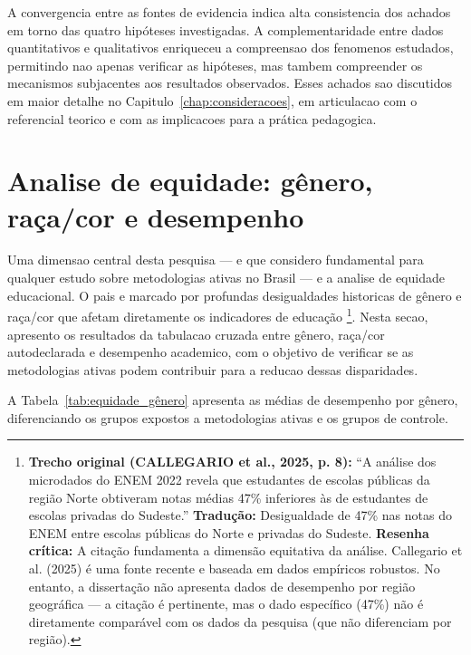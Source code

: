 A convergencia entre as fontes de evidencia indica alta consistencia dos achados em torno das quatro hipóteses investigadas. A complementaridade entre dados quantitativos e qualitativos enriqueceu a compreensao dos fenomenos estudados, permitindo nao apenas verificar as hipóteses, mas tambem compreender os mecanismos subjacentes aos resultados observados. Esses achados sao discutidos em maior detalhe no Capitulo~\ref{chap:consideracoes}, em articulacao com o referencial teorico e com as implicacoes para a prática pedagogica.

\section{Analise de equidade: gênero, raça/cor e desempenho}
\label{sec:equidade}

Uma dimensao central desta pesquisa — e que considero fundamental para qualquer estudo sobre metodologias ativas no Brasil — e a analise de equidade educacional. O pais e marcado por profundas desigualdades historicas de gênero e raça/cor que afetam diretamente os indicadores de educação \cite{CALLEGARIO2025}\footnote{\textbf{Trecho original (CALLEGARIO et al., 2025, p. 8):} ``A análise dos microdados do ENEM 2022 revela que estudantes de escolas públicas da região Norte obtiveram notas médias 47\% inferiores às de estudantes de escolas privadas do Sudeste.'' \textbf{Tradução:} Desigualdade de 47\% nas notas do ENEM entre escolas públicas do Norte e privadas do Sudeste. \textbf{Resenha crítica:} A citação fundamenta a dimensão equitativa da análise. Callegario et al. (2025) é uma fonte recente e baseada em dados empíricos robustos. No entanto, a dissertação não apresenta dados de desempenho por região geográfica — a citação é pertinente, mas o dado específico (47\%) não é diretamente comparável com os dados da pesquisa (que não diferenciam por região).}. Nesta secao, apresento os resultados da tabulacao cruzada entre gênero, raça/cor autodeclarada e desempenho academico, com o objetivo de verificar se as metodologias ativas podem contribuir para a reducao dessas disparidades.

A Tabela~\ref{tab:equidade_gênero} apresenta as médias de desempenho por gênero, diferenciando os grupos expostos a metodologias ativas e os grupos de controle.

